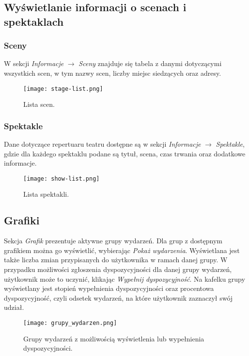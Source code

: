 \documentclass[shortabstract]{iithesis}
\begin{document}
\subsection{Wyświetlanie informacji o scenach i spektaklach}

\subsubsection{Sceny}
\label{stages}
W sekcji \textit{Informacje} $\rightarrow$ \textit{Sceny} znajduje się tabela z danymi dotyczącymi wszystkich scen, w tym nazwy scen, liczby miejsc siedzących oraz adresy.

\begin{figure}[h]
    \centering
    \texttt{[image: stage-list.png]}
    \caption{Lista scen.}
    \label{fig:stage-list}
\end{figure}

\subsubsection{Spektakle}
Dane dotyczące repertuaru teatru dostępne są w sekcji \textit{Informacje} $\rightarrow$ \textit{Spektakle}, gdzie dla każdego spektaklu podane są tytuł, scena, czas trwania oraz dodatkowe informacje.

\begin{figure}[h]
    \centering
    \texttt{[image: show-list.png]}
    \caption{Lista spektakli.}
    \label{fig:show-list}
\end{figure}



\subsection{Grafiki}

Sekcja \textit{Grafik} prezentuje aktywne grupy wydarzeń. Dla grup z dostępnym grafikiem można go wyświetlić, wybierając \textit{Pokaż wydarzenia}. Wyświetlana jest także liczba zmian przypisanych do użytkownika w ramach danej grupy.
\newpage
W przypadku możliwości zgłoszenia dyspozycyjności dla danej grupy wydarzeń, użytkownik może to uczynić, klikając \textit{Wypełnij dyspozycyjność}. Na kafelku grupy wyświetlany jest stopień wypełnienia dyspozycyjności oraz procentowa dyspozycyjność, czyli odsetek wydarzeń, na które użytkownik zaznaczył swój udział.

\begin{figure}[h]
    \centering
    \texttt{[image: grupy\_wydarzen.png]}
    \caption{Grupy wydarzeń z możliwością wyświetlenia lub wypełnienia dyspozycyjności.}
    \label{fig:event-groups}
\end{figure}
\end{document}
